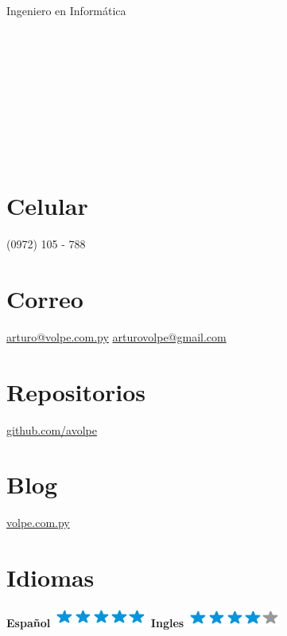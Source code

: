\documentclass[]{friggeri-cv}
\begin{document}
{Ingeniero en Informática}


\begin{aside}
	\section{}~
    \section{}~
    \section{}~
    \section{Celular}
        (0972) 105 - 788
        ~
    \section{Correo}
        \href{mailto:arturo@volpe.com.py}{arturo@volpe.com.py}
        \href{mailto:arturovolpe@gmail.com}{arturovolpe@gmail.com}
        ~
    \section{Repositorios}
        \href{https://github.com/avolpe}{github.com/avolpe}
        ~
    \section{Blog}
        \href{https://www.volpe.com.py}{volpe.com.py}
        ~
\section{Idiomas}
\textbf{Español}\includegraphics[scale=0.40]{img/5stars.png}
\textbf{Ingles}\includegraphics[scale=0.40]{img/4stars.png}
\end{aside}
\end{document}
